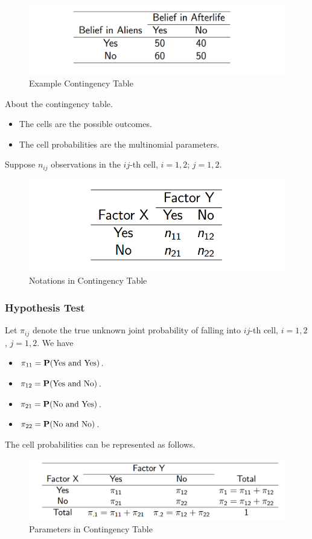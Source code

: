 \begin{figure}[H]
	\centering
	\includegraphics[width=0.7\linewidth]{fig/2x2-table2}
	\caption{Example Contingency Table}
	\label{fig:2x2-table2}
\end{figure}

About the contingency table.
\begin{itemize}
	\item The cells are the possible outcomes.
	\item The cell probabilities are the multinomial parameters.
\end{itemize}

Suppose $n_{ij}$ observations in the $ij$-th cell, $i = 1, 2$; $j = 1, 2$.
\begin{figure}[H]
	\centering
	\includegraphics[width=0.5\linewidth]{fig/2x2-table3}
	\caption{Notations in Contingency Table}
	\label{fig:2x2-table3}
\end{figure}

\subsubsection{Hypothesis Test}
Let $\pi_{ij}$ denote the true unknown joint probability of falling into $ij$-th cell, $i = 1, 2$, $j=1,2$. We have
\begin{itemize}
	\item $\pi_{11} = \P(\text{Yes and Yes})$.
	\item $\pi_{12} = \P(\text{Yes and No})$.
	\item $\pi_{21} = \P(\text{No and Yes})$.
	\item $\pi_{22} = \P(\text{No and No})$.
\end{itemize}
The cell probabilities can be represented as follows. 

\begin{figure}[H]
	\centering
	\includegraphics[width=0.7\linewidth]{fig/2x2-table4}
	\caption{Parameters in Contingency Table}
	\label{fig:2x2-table4}
\end{figure}

